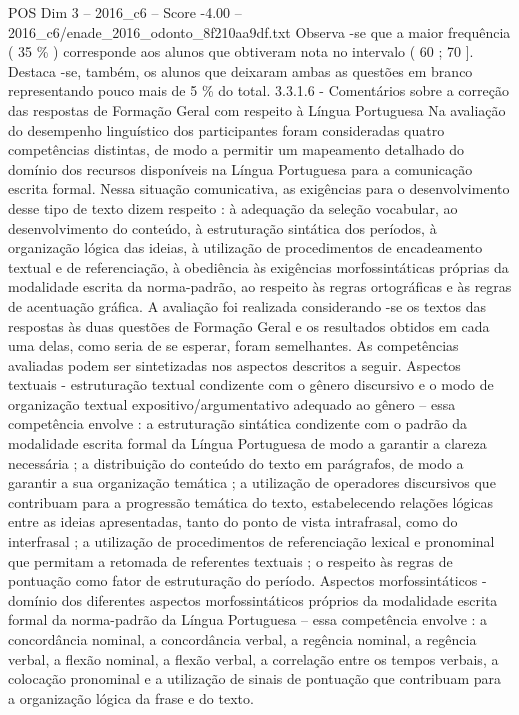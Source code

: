 \begin{textsample}{POS Dim 3 – 2016\_c6 – Score -4.00 – 2016\_c6/enade\_2016\_odonto\_8f210aa9df.txt}
Observa -se que a maior frequência ( 35 \% ) corresponde aos alunos que obtiveram nota no intervalo ( 60 ; 70 ].
Destaca -se, também, os alunos que deixaram ambas as questões em branco representando pouco mais de 5 \% do total. 3.3.1.6 - Comentários sobre a correção das respostas de Formação Geral com respeito à Língua Portuguesa Na avaliação do desempenho linguístico dos participantes foram consideradas quatro competências distintas, de modo a permitir um mapeamento detalhado do domínio dos recursos disponíveis na Língua Portuguesa para a comunicação escrita formal.
Nessa situação comunicativa, as exigências para o desenvolvimento desse tipo de texto dizem respeito : à adequação da seleção vocabular, ao desenvolvimento do conteúdo, à estruturação sintática dos períodos, à organização lógica das ideias, à utilização de procedimentos de encadeamento textual e de referenciação, à obediência às exigências morfossintáticas próprias da modalidade escrita da norma-padrão, ao respeito às regras ortográficas e às regras de acentuação gráfica.
A avaliação foi realizada considerando -se os textos das respostas às duas questões de Formação Geral e os resultados obtidos em cada uma delas, como seria de se esperar, foram semelhantes.
As competências avaliadas podem ser sintetizadas nos aspectos descritos a seguir.
Aspectos textuais - estruturação textual condizente com o gênero discursivo e o modo de organização textual expositivo/argumentativo adequado ao gênero – essa competência envolve : a estruturação sintática condizente com o padrão da modalidade escrita formal da Língua Portuguesa de modo a garantir a clareza necessária ; a distribuição do conteúdo do texto em parágrafos, de modo a garantir a sua organização temática ; a utilização de operadores discursivos que contribuam para a progressão temática do texto, estabelecendo relações lógicas entre as ideias apresentadas, tanto do ponto de vista intrafrasal, como do interfrasal ; a utilização de procedimentos de referenciação lexical e pronominal que permitam a retomada de referentes textuais ; o respeito às regras de pontuação como fator de estruturação do período.
Aspectos morfossintáticos - domínio dos diferentes aspectos morfossintáticos próprios da modalidade escrita formal da norma-padrão da Língua Portuguesa – essa competência envolve : a concordância nominal, a concordância verbal, a regência nominal, a regência verbal, a flexão nominal, a flexão verbal, a correlação entre os tempos verbais, a colocação pronominal e a utilização de sinais de pontuação que contribuam para a organização lógica da frase e do texto.

\end{textsample}
